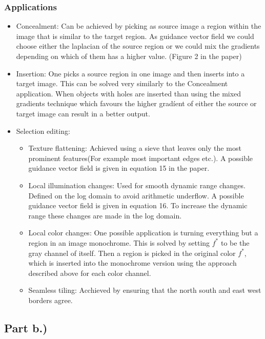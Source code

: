 \documentclass[]{book}
\theoremstyle{definition}
\begin{document}
\subsubsection*{Applications}
\begin{itemize}
\item Concealment: Can be achieved by picking as source image a region within the image that is similar to the target region. As guidance vector field we could choose either the laplacian of the source region or we could mix the gradients depending on which of them has a higher value. (Figure 2 in the paper)
\item Insertion: One picks a source region in one image and then inserts into a target image. This can be solved very similarly to the Concealment application. When objects with holes are inserted than using the mixed gradients technique which favours the higher gradíent of either the source or target image can result in a better output.
\item Selection editing:
\begin{itemize}
\item Texture flattening: Achieved using a sieve that leaves only the most prominent features(For example most important edges etc.). A possible guidance vector field is given in equation 15 in the paper.
\item Local illumination changes: Used for smooth dynamic range changes. Defined on the log domain to avoid arithmetic underflow. A possible guidance vector field is given in equation 16. To increase the dynamic range these changes are made in the log domain.
\item Local color changes: One possible application is turning everything but a region in an image monochrome. This is solved by setting $f^*$ to be the gray channel of itself. Then a region is picked in the original color $f^*$, which is inserted into the monochrome version using the approach described above for each color channel.
\item Seamless tiling: Acchieved by ensuring that the north south and east west borders agree.
\end{itemize}
\end{itemize}

\subsection*{Part b.)}
\end{document}
